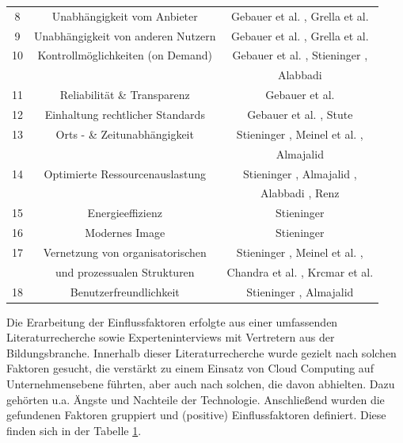\begin{table}[!tbp]
\begin{center}
{\begin{tabular}{c c c }
				8 & Unabhängigkeit vom Anbieter & Gebauer et al. \cite{gebauer}, Grella et al. \cite{grella} \\
				9 & Unabhängigkeit von anderen Nutzern & Gebauer et al. \cite{gebauer}, Grella et al. \cite{grella} \\
				10 & Kontrollmöglichkeiten (on Demand) & Gebauer et al. \cite{gebauer}, Stieninger \cite{stieninger}, \\
				&& Alabbadi \cite{alabbadi} \\
				11 & Reliabilität \& Transparenz & Gebauer et al. \cite{gebauer} \\
				12 & Einhaltung rechtlicher Standards & Gebauer et al. \cite{gebauer}, Stute \cite{stute} \\
				13 & Orts - \& Zeitunabhängigkeit & Stieninger \cite{stieninger}, Meinel et al. \cite{meinel} \cite{meinel2}, \\
				&& Almajalid \cite{almajalid} \\
				14 & Optimierte Ressourcenauslastung & Stieninger \cite{stieninger}, Almajalid \cite{almajalid}, \\
				&& Alabbadi \cite{alabbadi}, Renz \cite{renz} \\
				15 & Energieeffizienz & Stieninger \cite{stieninger} \\
				16 & Modernes Image & Stieninger \cite{stieninger} \\
				17 & Vernetzung von organisatorischen & Stieninger \cite{stieninger}, Meinel et al. \cite{meinel}, \\
				& und prozessualen Strukturen & Chandra et al. \cite{chandra}, Krcmar et al. \cite{krcmar} \\
				18 & Benutzerfreundlichkeit & Stieninger \cite{stieninger}, Almajalid \cite{almajalid} \\
				\hline
			\end{tabular}
		}
		\label{tab:factors1}
	\end{center}
\end{table}
\FloatBarrier

Die Erarbeitung der Einflussfaktoren erfolgte aus einer umfassenden Literaturrecherche sowie Experteninterviews mit Vertretern aus der Bildungsbranche. Innerhalb dieser Literaturrecherche wurde gezielt nach solchen Faktoren gesucht, die verstärkt zu einem Einsatz von Cloud Computing auf Unternehmensebene führten, aber auch nach solchen, die davon abhielten. Dazu gehörten u.a. Ängste und Nachteile der Technologie. Anschließend wurden die gefundenen Faktoren gruppiert und (positive) Einflussfaktoren definiert. Diese finden sich in der Tabelle \ref{tab:factors1}.

